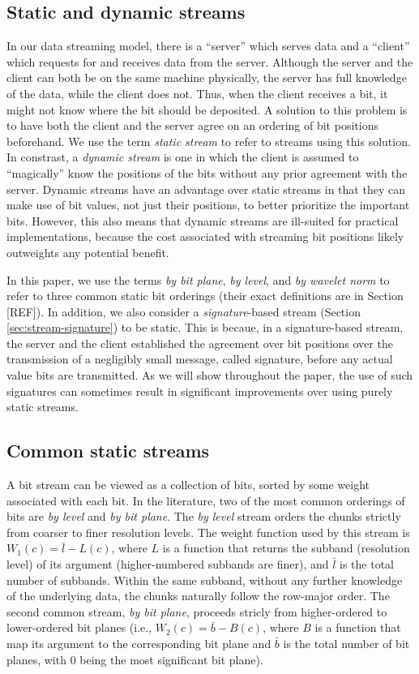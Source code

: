 \subsection{Static and dynamic streams}
\label{sec:static-dynamic-streams}

In our data streaming model, there is a ``server'' which serves data and a ``client'' which requests
for and receives data from the server. Although the server and the client can both be on the same
machine physically, the server has full knowledge of the data, while the client does not. Thus, when
the client receives a bit, it might not know where the bit should be deposited. A solution to this
problem is to have both the client and the server agree on an ordering of bit positions beforehand.
We use the term \emph{static stream} to refer to streams using this solution. In constrast, a
\emph{dynamic stream} is one in which the client is assumed to ``magically'' know the positions of
the bits without any prior agreement with the server. Dynamic streams have an advantage over static
streams in that they can make use of bit values, not just their positions, to better prioritize the
important bits. However, this also means that dynamic streams are ill-suited for practical
implementations, because the cost associated with streaming bit positions likely outweights any
potential benefit.

In this paper, we use the terms \emph{by bit plane}, \emph{by level}, and \emph{by wavelet norm} to
refer to three common static bit orderings (their exact definitions are in Section [REF]). In
addition, we also consider a \emph{signature}-based stream (Section \ref{sec:stream-signature}) to
be static. This is becaue, in a signature-based stream, the server and the client established the
agreement over bit positions over the transmission of a negligibly small message, called signature,
before any actual value bits are transmitted. As we will show throughout the paper, the use of such
signatures can sometimes result in significant improvements over using purely static streams.

\subsection{Common static streams}
A bit stream can be viewed as a collection of bits, sorted by some weight associated with each bit.
In the literature, two of the most common orderings of bits are \emph{by level} and \emph{by bit
plane}. The \emph{by level} stream orders the chunks strictly from coarser to finer resolution
levels. The weight function used by this stream is $W_1(c)=\bar{l}-L(c)$, where $L$ is a function
that returns the subband (resolution level) of its argument (higher-numbered subbands are finer),
and $\bar{l}$ is the total number of subbands. Within the same subband, without any further
knowledge of the underlying data, the chunks naturally follow the row-major order. The second common
stream, \emph{by bit plane}, proceeds stricly from higher-ordered to lower-ordered bit planes (i.e.,
$W_2(c)=\bar{b}-B(c)$, where $B$ is a function that map its argument to the corresponding bit plane
and $\bar{b}$ is the total number of bit planes, with $0$ being the most significant bit plane). 

